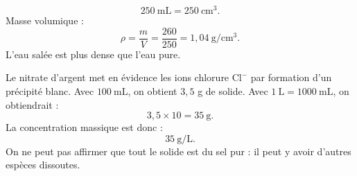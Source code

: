 \begin{correction}
\[
250\ \mathrm{mL}=250\ \mathrm{cm^3}.
\]
Masse volumique :
\[
\rho=\frac{m}{V}=\frac{260}{250}=1{,}04\ \mathrm{g/cm^3}.
\]
L'eau salée est plus dense que l'eau pure.

Le nitrate d'argent met en évidence les ions chlorure $\mathrm{Cl^-}$ par formation d'un précipité blanc.
Avec $100\ \mathrm{mL}$, on obtient $3{,}5$ g de solide. Avec $1\ \mathrm{L}=1000\ \mathrm{mL}$, on obtiendrait :
\[
3{,}5\times10=35\ \mathrm{g}.
\]
La concentration massique est donc :
\[
35\ \mathrm{g/L}.
\]
On ne peut pas affirmer que tout le solide est du sel pur : il peut y avoir d'autres espèces dissoutes.
\end{correction}